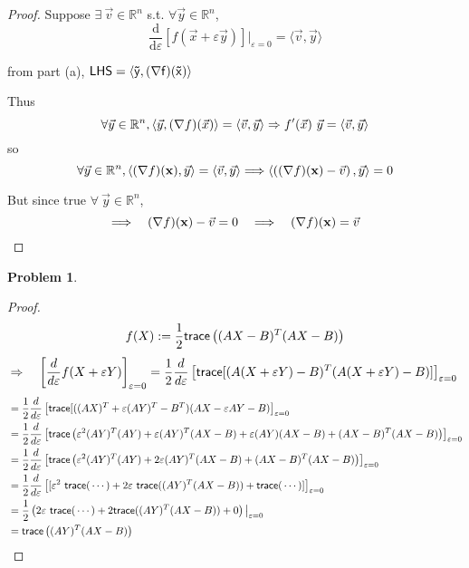 \documentclass[10pt]{article}
\theoremstyle{plain}
\theoremstyle{definition}
\newtheorem{prob}{Problem}
\providecommand{\R}{\mathbb{R}}%
\providecommand{\tr}{{\sf trace}}%
\numberwithin{equation}{section}
\renewcommand{\epsilon}{\varepsilon}
\begin{document}
\begin{proof}
  Suppose $\exists \ \vec{v} \in \R^{n}$ s.t. $\forall \vec{y} \in \R^{n}$,
 \[
  \frac{\mathrm{d}}{\mathrm{d} \epsilon} \left[ f(\vec{x} + \epsilon
  \vec{y}) \right] \big|_{\epsilon=0}
  = \langle \vec{v} , \vec{y} \rangle
\]

from part {(a)}, $ \sf{LHS} = \langle \vec{y} , (\nabla f) (\vec{x}) \rangle \\ $

Thus
\[
  \forall \vec{y} \in \R^{n} ,
  \langle \vec{y} , (\nabla f) (\vec{x}) \rangle
  = \langle \vec{v} , \vec{y} \rangle \\
  \Rightarrow f'(\vec{x})\ \vec{y} = \langle \vec{v} , \vec{y} \rangle \\
\]
so
\[
  \forall \vec{y} \in \R^{n},
  \langle (\nabla f) (\mathbf{x}) , \vec{y} \rangle
  = \langle \vec{v} , \vec{y} \rangle \\
  \Longrightarrow 
  \langle \left((\nabla f) (\mathbf{x}) - \vec{v} \right) , \vec{y} \rangle
  = 0
\]

But since true $\forall \ \vec{y} \in \R^{n}$,
\[
  \Longrightarrow \quad
  (\nabla f) (\mathbf{x}) - \vec{v} = 0\\
  \quad \Longrightarrow \quad
  (\nabla f) (\mathbf{x}) = \vec{v}\\
\]
\end{proof}

\begin{prob}
\end{prob}

\begin{proof}
\[
f(X) := \frac{1}{2}\tr\left((AX-B)^T(AX-B)\right)
\]
\[
\Rightarrow \quad   
\left[ \frac{d}{d \epsilon} f(X + \epsilon Y) \right]_{\epsilon=0} 
= \frac{1}{2} \frac{d}{d \epsilon} \left[ \tr[ ( A (X+ \epsilon Y ) - B)^T ( A ( X + \epsilon Y ) - B)]\right]_{\epsilon=0} \\
\]
\[
\begin{aligned}
&= \frac{1}{2} \frac{d}{d \epsilon} \left[ \tr[ ( (AX)^T + \epsilon (AY)^T - B^T ) ( AX - \epsilon AY -B ) \right]_{\epsilon=0} \\
&= \frac{1}{2} \frac{d}{d \epsilon} \left[ \tr\left( \epsilon^2 (AY)^T(AY)
        + \epsilon (AY)^T (AX-B)
        + \epsilon (AY) (AX-B)
        + (AX-B)^T (AX-B) \right)\right]_{\epsilon=0} \\
&= \frac{1}{2} \frac{d}{d \epsilon} \left[ \tr\left( \epsilon^2 (AY)^T(AY)
        +  2 \epsilon (AY)^T (AX-B)
        + (AX-B)^T (AX-B) \right)\right]_{\epsilon=0} \\
&= \frac{1}{2} \frac{d}{d \epsilon} \left[ [ \epsilon^2 \ \tr( \, \cdots \, )
        + 2 \epsilon \ \tr( (AY)^T (AX-B) )
        + \tr( \, \cdots \, )]\right]_{\epsilon=0} \\
&= \frac{1}{2} \left( 2 \epsilon \ \tr( \, \cdots \, ) + 2 \tr( (AY)^T (AX -B)) + 0 \right) \big|_{\epsilon=0} \\
&= \tr \left( (AY)^T (AX - B) \right) \\
\end{aligned}
\]
\end{proof}
\end{document}
